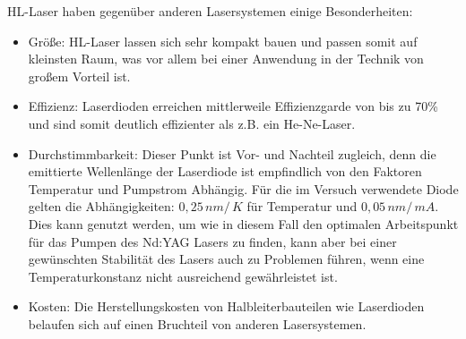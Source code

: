 \documentclass[twoside,colorback,accentcolor=tud4c,11pt]{tudreport}
\begin{document}
HL-Laser haben gegenüber anderen Lasersystemen einige Besonderheiten:
\begin{itemize}
\item Größe: HL-Laser lassen sich sehr kompakt bauen und passen somit auf kleinsten Raum, was vor allem bei einer Anwendung in der Technik von großem Vorteil ist.
\item Effizienz: Laserdioden erreichen mittlerweile Effizienzgarde von bis zu 70\% und sind somit deutlich effizienter als z.B. ein He-Ne-Laser.
\item Durchstimmbarkeit: Dieser Punkt ist Vor- und Nachteil zugleich, denn die emittierte Wellenlänge der Laserdiode ist empfindlich von den Faktoren Temperatur und Pumpstrom Abhängig. Für die im Versuch verwendete Diode gelten die Abhängigkeiten: $0,25\,\si{nm}/\,\si{K}$ für Temperatur und $0,05\,\si{nm}/\,\si{mA}$. Dies kann genutzt werden, um wie in diesem Fall den optimalen Arbeitspunkt für das Pumpen des Nd:YAG Lasers zu finden, kann aber bei einer gewünschten Stabilität des Lasers auch zu Problemen führen, wenn eine Temperaturkonstanz nicht ausreichend gewährleistet ist.
\item Kosten: Die Herstellungskosten von Halbleiterbauteilen wie Laserdioden belaufen sich auf einen Bruchteil von anderen Lasersystemen.
\end{itemize}\cite{anl,laser}
\end{document}
